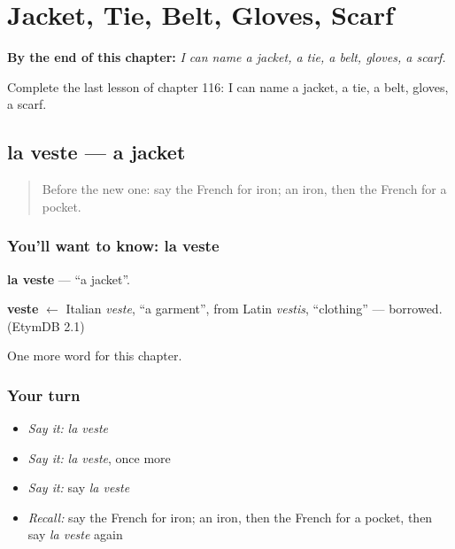 
\chapter{Jacket, Tie, Belt, Gloves, Scarf}
\label{ch:fr-jacket-tie-belt-gloves-scarf}

\begin{chapteropening}
\textbf{By the end of this chapter:} \emph{I can name a jacket, a tie, a belt, gloves, a scarf.}

Complete the last lesson of chapter 116: I can name a jacket, a tie, a belt, gloves, a scarf.
\end{chapteropening}

\section[la veste]{la veste — a jacket}

\label{lesson:FR-C116-veste}



\begin{quote}
Before the new one: say the French for iron; an iron, then the French for a pocket.
\end{quote}

\subsection*{You'll want to know: la veste}
\textbf{la veste} — \textquotedblleft{}a jacket\textquotedblright{}.

\begin{cousinweb}
\textbf{veste} $\leftarrow$ Italian \emph{veste}, \textquotedblleft{}a garment\textquotedblright{}, from Latin \emph{vestis}, \textquotedblleft{}clothing\textquotedblright{} — borrowed. (EtymDB 2.1)
\end{cousinweb}

\begin{grammarlens}[title={What you've built}]
One more word for this chapter.
\end{grammarlens}

\subsection*{Your turn}
\begin{itemize}
\raggedright
  \item \emph{Say it:} \emph{la veste}
  \item \emph{Say it:} \emph{la veste}, once more
  \item \emph{Say it:} say \emph{la veste}
  \item \emph{Recall:} say the French for iron; an iron, then the French for a pocket, then say \emph{la veste} again
\end{itemize}

